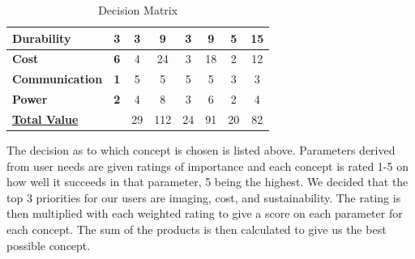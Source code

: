 \begin{table}[h]
{\begin{tabular}{lc|cc|cc|cc|}
\multicolumn{1}{|l|}{\textbf{Durability}}      & \textbf{3}                                   & \multicolumn{1}{c|}{3}               & 9                                                                             & \multicolumn{1}{c|}{3}               & 9                                                                             & \multicolumn{1}{c|}{5}               & 15                                                                            \\ \hline
\multicolumn{1}{|l|}{\textbf{Cost}}            & \textbf{6}                                   & \multicolumn{1}{c|}{4}               & 24                                                                            & \multicolumn{1}{c|}{3}               & 18                                                                            & \multicolumn{1}{c|}{2}               & 12                                                                            \\ \hline
\multicolumn{1}{|l|}{\textbf{Communication}}   & \textbf{1}                                   & \multicolumn{1}{c|}{5}               & 5                                                                             & \multicolumn{1}{c|}{5}               & 5                                                                             & \multicolumn{1}{c|}{3}               & 3                                                                             \\ \hline
\multicolumn{1}{|l|}{\textbf{Power}}           & \textbf{2}                                   & \multicolumn{1}{c|}{4}               & 8                                                                             & \multicolumn{1}{c|}{3}               & 6                                                                             & \multicolumn{1}{c|}{2}               & 4                                                                             \\ \hline
\multicolumn{2}{|l|}{{\ul \textbf{Total Value}}}                                              & \multicolumn{1}{c|}{29}              & 112                                                                           & \multicolumn{1}{c|}{24}              & 91                                                                            & \multicolumn{1}{c|}{20}              & 82                                                                            \\ \hline
\end{tabular}%
}
\caption{Decision Matrix}
\label{tab:my-table}
\end{table}
The decision as to which concept is chosen is listed above. Parameters derived from user needs are given ratings of importance and each concept is rated 1-5 on how well it succeeds in that parameter, 5 being the highest. We decided that the top 3 priorities for our users are imaging, cost, and sustainability. The rating is then multiplied with each weighted rating to give a score on each parameter for each concept. The sum of the products is then calculated to give us the best possible concept.\\
\vspace{1.5mm}

